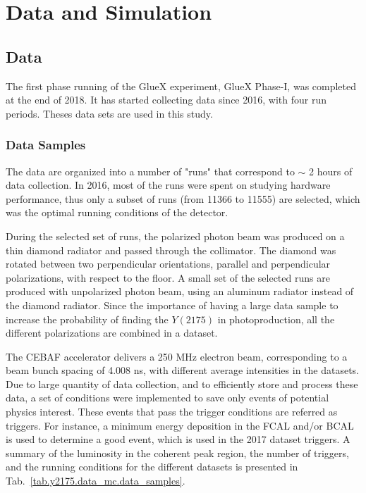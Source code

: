 \section{Data and Simulation}
\label{chap.y2175.data_mc}

\subsection{Data}

The first phase running of the GlueX experiment, GlueX Phase-I, was completed at the end of 2018. It has started collecting data since 2016, with four run periods. Theses data sets are used in this study.

\subsubsection{Data Samples}
\label{chap.y2175.data_mc.data_samples}

The data are organized into a number of "runs" that correspond to $\sim$ 2 hours of data collection. In 2016, most of the runs were spent on studying hardware performance, thus only a subset of runs (from 11366 to 11555) are selected, which was the optimal running conditions of the detector.
~\par During the selected set of runs, the polarized photon beam was produced on a thin diamond radiator and passed through the collimator. The diamond was rotated between two perpendicular orientations, parallel and perpendicular polarizations, with respect to the floor. A small set of the selected runs are produced with unpolarized photon beam, using an aluminum radiator instead of the diamond radiator. Since the importance of having a large data sample to increase the probability of finding the $Y(2175)$ in photoproduction, all the different polarizations are combined in a dataset.
~\par The CEBAF accelerator delivers a 250 MHz electron beam, corresponding to a beam bunch spacing of 4.008 ns, with different average intensities in the datasets. Due to large quantity of data collection, and to efficiently store and process these data, a set of conditions were implemented to save only events of potential physics interest. These events that pass the trigger conditions are referred as triggers. For instance, a minimum energy deposition in the FCAL and/or BCAL is used to determine a good event, which is used in the 2017 dataset triggers. A summary of the luminosity in the coherent peak region, the number of triggers, and the running conditions for the different datasets is presented in Tab.~\ref{tab.y2175.data_mc.data_samples}.

